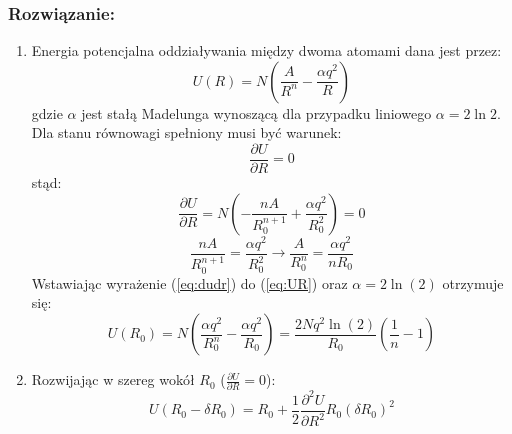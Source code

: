 \subsubsection*{Rozwiązanie:}
\begin{enumerate}
\item Energia potencjalna oddziaływania między dwoma atomami dana jest przez:
\begin{equation}
\label{eq:UR}
U(R) = N\left( \frac{A}{R^n} - \frac{\alpha q^2}{R} \right)
\end{equation}
gdzie $\alpha$ jest stałą Madelunga wynoszącą dla przypadku liniowego $\alpha = 2\ln 2$.\\
Dla stanu równowagi spełniony musi być warunek:
\begin{equation}
\frac{\partial U}{\partial R} = 0
\end{equation}
stąd:
\begin{equation}
\frac{\partial U}{\partial R} = N \left( -\frac{nA}{R_0^{n+1}} + \frac{\alpha q^2}{R_0^2} \right)= 0
\end{equation}
\begin{equation}
\label{eq:dudr}
\frac{nA}{R_0^{n+1}} = \frac{\alpha q^2}{R_0^2} \rightarrow \frac{A}{R_0^n} = \frac{\alpha q^2}{n R_0}
\end{equation}
Wstawiając wyrażenie (\ref{eq:dudr}) do (\ref{eq:UR}) oraz $\alpha=2\ln(2)$ otrzymuje się:
\begin{equation}
U(R_0) = N \left( \frac{\alpha q^2}{R_0^n} - \frac{\alpha q^2}{R_0} \right) = \frac{2Nq^2\ln(2)}{R_0} \left( \frac{1}{n} -1 \right)
\end{equation}
\hrulefill
\item Rozwijając w szereg wokół $R_0$ ($\frac{\partial U}{\partial R} =0 $):
\begin{equation}
U(R_0-\delta R_0 ) = R_0 + \frac{1}{2} \frac{\partial^2 U}{\partial R^2} R_0 (\delta R_0)^2
\end{equation}
\end{enumerate}
